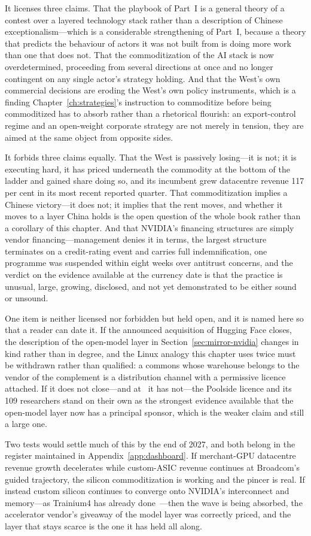 It licenses three claims. That the playbook of Part~I is a general theory of a contest over a layered technology stack rather than a description of Chinese exceptionalism---which is a considerable strengthening of Part~I, because a theory that predicts the behaviour of actors it was not built from is doing more work than one that does not. That the commoditization of the AI stack is now overdetermined, proceeding from several directions at once and no longer contingent on any single actor's strategy holding. And that the West's own commercial decisions are eroding the West's own policy instruments, which is a finding Chapter~\ref{ch:strategies}'s instruction to commoditize before being commoditized has to absorb rather than a rhetorical flourish: an export-control regime and an open-weight corporate strategy are not merely in tension, they are aimed at the same object from opposite sides.

It forbids three claims equally. That the West is passively losing---it is not; it is executing hard, it has priced underneath the commodity at the bottom of the ladder and gained share doing so, and its incumbent grew datacentre revenue 117 per cent in its most recent reported quarter. That commoditization implies a Chinese victory---it does not; it implies that the rent moves, and whether it moves to a layer China holds is the open question of the whole book rather than a corollary of this chapter. And that NVIDIA's financing structures are simply vendor financing---management denies it in terms, the largest structure terminates on a credit-rating event and carries full indemnification, one programme was suspended within eight weeks over antitrust concerns, and the verdict on the evidence available at the currency date is that the practice is unusual, large, growing, disclosed, and not yet demonstrated to be either sound or unsound.

One item is neither licensed nor forbidden but held open, and it is named here so that a reader can date it. If the announced acquisition of Hugging Face closes, the description of the open-model layer in Section~\ref{sec:mirror-nvidia} changes in kind rather than in degree, and the Linux analogy this chapter uses twice must be withdrawn rather than qualified: a commons whose warehouse belongs to the vendor of the complement is a distribution channel with a permissive licence attached. If it does not close---and at \datafreeze\ it has not---the Poolside licence and its 109 researchers stand on their own as the strongest evidence available that the open-model layer now has a principal sponsor, which is the weaker claim and still a large one.

Two tests would settle much of this by the end of 2027, and both belong in the register maintained in Appendix~\ref{app:dashboard}. If merchant-GPU datacentre revenue growth decelerates while custom-ASIC revenue continues at Broadcom's guided trajectory, the silicon commoditization is working and the pincer is real. If instead custom silicon continues to converge onto NVIDIA's interconnect and memory---as Trainium4 has already done~\cite{aws-nvda}---then the wave is being absorbed, the accelerator vendor's giveaway of the model layer was correctly priced, and the layer that stays scarce is the one it has held all along.
